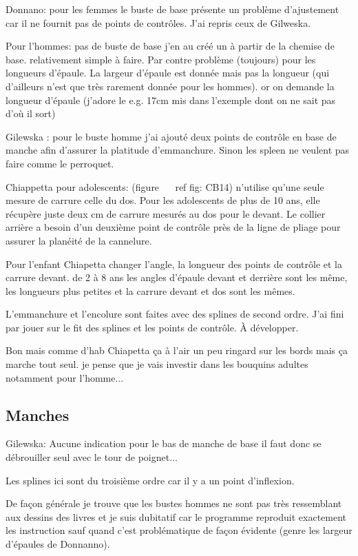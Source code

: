 \documentclass[11pt,a4paper]{report}
\begin{document}
Donnano:  pour les femmes le buste de base présente un problème d'ajustement car il ne
fournit pas de points de contrôles. J'ai repris ceux de Gilweska.

Pour l'hommes: pas de buste de base j'en au  créé un à partir de la chemise de base.
relativement simple à faire. Par contre problème (toujours) pour les
longueurs d'épaule. La largeur d'épaule est donnée mais pas la
longueur (qui d'ailleurs n'est que très rarement donnée pour les
hommes). or on demande la longueur d'épaule (j'adore le e.g. 17cm mis
dans l'exemple dont on ne sait pas d'où il sort)

Gilewska : pour le buste homme j'ai ajouté  deux points de contrôle
en base de manche  afin d'assurer la platitude d'emmanchure. Sinon les
spleen ne veulent pas faire comme le perroquet.


Chiappetta pour adolescents: (figure ~ \ ref {fig: CB14}) n'utilise qu'une seule mesure de carrure celle du dos. Pour les adolescents de plus de 10 ans, elle récupère juste deux cm de carrure mesurés au dos pour le devant. Le collier arrière a besoin d'un deuxième point de contrôle près de la ligne de pliage pour assurer la planéité de la cannelure.

Pour l'enfant Chiapetta changer l'angle, la longueur des points de contrôle et la carrure devant. de 2 à 8 ans les angles d'épaule devant et derrière sont les même, les longueurs plus petites et la carrure devant et dos sont les mêmes.

L'emmanchure et l'encolure sont faites avec des splines de second ordre. J'ai fini par jouer sur le fit des splines et les points de contrôle. À développer.

Bon mais comme d'hab Chiapetta ça à l'air un peu ringard sur les bords mais ça marche tout seul. je pense que je vais investir dans
les bouquins adultes notamment pour l'homme...


\subsection{Manches}
Gilewska: Aucune indication pour le bas de manche de base il faut donc
se débrouiller seul avec le tour de poignet...

Les splines ici sont du troisième ordre car il y a un point d'inflexion.


De façon générale je trouve que les bustes hommes ne sont pas très ressemblant aux dessins des livres et je suis dubitatif car le programme reproduit exactement les instruction sauf quand c'est problématique de façon évidente (genre les largeur d'épaules de Donnanno).
\end{document}
